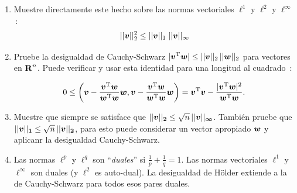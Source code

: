 \documentclass[12pt,a4paper]{article}
\newcommand{\bi}[1]{\hbox{\boldmath$#1$}}
\newcommand\1{\mbox{\,\vrule height-0.8pt depth1.0pt width2pc\,}}
\newcommand\2{\mbox{\,\vrule height-0.8pt depth1.0pt width1pc\,}}
\DeclareRobustCommand\transp{^{\mathrm{T}}}
\newcommand{\bv}{\hbox{\boldmath$v$}}
\newcommand{\bw}{\hbox{\boldmath$w$}}
\begin{document}
\begin{enumerate}
    
    \item Muestre directamente este hecho sobre las normas vectoriales $\ell^1$ y $\ell^2$ y $\ell^\infty$ \,: $$||\bv||^2_2\leq ||\bv||_1\;||\bv||_\infty$$
\item Pruebe la desigualdad de Cauchy-Schwarz $|\bv\transp\bw|\leq||\bv||_2\,||\bw||_2$ para vectores en $\hbox{\textbf{R}}^n$. Puede verificar y usar esta identidad para una longitud al cuadrado \,:

\vspace{-9pt}
$$
0\leq\left(\bv-\dfrac{\bv\transp\bw}{\bw\transp\bw}\bw, \bv-\dfrac{\bv\transp\bw}{\bw\transp\bw}\bw\right)=\bv\transp\bv-\dfrac{|\bv\transp\bw|^2}{\bw\transp\bw}.
$$

\item Muestre que siempre se satisface que $||\bv||_{\text{\scriptsize $\bi{2}$}}\leq\sqrt{n}\,||\bv||_{\text{\scriptsize $\bi{\infty}$}}$. También pruebe que $||\bv||_{\text{\scriptsize $\bi{1}$}}\leq\sqrt{n}\,||\bv||_{\text{\scriptsize $\bi{2}$}}$, para esto puede considerar un vector apropiado $\bw$ y aplicanr la desigualdad Cauchy-Schwarz.

\item Las normas $\ell^p$ y $\ell^q$ son ``\emph{duales}'' si $\frac1p + \frac1q =1$. Las normas vectoriales $\ell^1$ y $\ell^\infty$ son duales (y $\ell^2$ es auto-dual). La desigualdad de H\"{o}lder  extiende a la de Cauchy-Schwarz para todos esos pares duales.


\end{enumerate}
\end{document}
